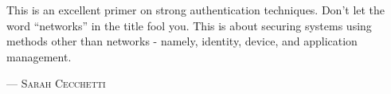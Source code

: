 This is an excellent primer on strong authentication techniques. Don’t let the word “networks” in the title fool you. This is about securing systems using methods other than networks - namely, identity, device, and application management. 
\setlength{\parindent}{0cm}\par\textsc{ --- Sarah Cecchetti }\par\vspace{12pt}\setlength{\parindent}{15pt}
